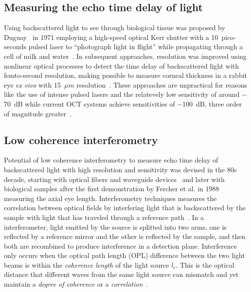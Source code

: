 \subsection{Measuring the echo time delay of light}

Using backscattered light to see through biological tissue was proposed by Duguay~\cite{Duguay1971_Light, Duguay1971_Ultrahigh} in 1971 employing a high-speed optical Kerr shutter with a 10~pico-seconds pulsed laser to ``photograph light in flight'' while propagating through a cell of milk and water~\cite{Duguay1971_Ultrahigh}. In subsequent approaches, resolution was improved using nonlinear optical processes to detect the time delay of backscattered light with femto-second resolution, making possible to measure corneal thickness in a rabbit eye \textit{ex vivo} with 15~$\mu m$ resolution~\cite{Fujimoto1986_Femtosecond}. These approaches are unpractical for reasons like the use of intense pulsed lasers and the relatevely low  sensitivity of around $-$70~dB while current OCT systems achieve sensitivities of $-$100~dB, three order of magnitude greater~\cite{Fujimoto2015_Introduction}.

\subsection{Low coherence interferometry}

Potential of low coherence interferometry to measure echo time delay of backscattered light with high resolution and sensitivity was devised in the 80s decade, starting with optical fibers and waveguide devices~\cite{Takada1987_New, Youngquist1987_Optical} and later with biological samples after the first demonstration by Fercher et al. in 1988~\cite{Fercher1988_Eyelength} measuring the axial eye length. Interferometry techniques measures the correlation between optical fields by interfering light that is backscattered by the sample with light that has traveled through a reference path~\cite{Malacara2007_Optical}. In a interferometer, light emitted by the source is splitted into two arms, one is reflected by a reference mirror and the other is reflected by the sample, and then both are recombined to produce interference in a detection plane. Interference only occurs when the optical path length (OPL) difference between the two light beams is within the \textit{coherence length} of the light source $l_c$. This is the optical distance that different waves from the same light source can mismatch and yet maintain a \textit{degree of coherence} or a \textit{correlation}~\cite{Hecht2017_Optics}. %

